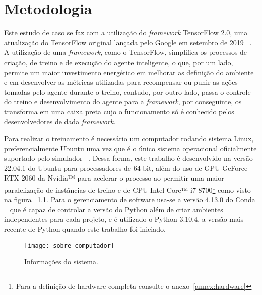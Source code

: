 

\chapter{Metodologia}
\label{cap:dqn}

Este estudo de caso se faz com a utilização do \emph{framework} TensorFlow 2.0, uma atualização do TensorFlow original lançada pelo Google em setembro de 2019 ~\citep{TensorFlow2-release}. A utilização de uma \emph{framework}, como o TensorFlow, simplifica os processos de criação, de treino e de execução do agente inteligente, o que, por um lado, permite um maior investimento energético em melhorar as definição do ambiente e em desenvolver as métricas utilizadas para recompensar ou punir as ações tomadas pelo agente durante o treino, contudo, por outro lado, passa o controle do treino e desenvolvimento do agente para a \emph{framework}, por conseguinte, os transforma em uma caixa preta cujo o funcionamento só é conhecido pelos desenvolvedores de dada \emph{framework}.

Para realizar o treinamento é necessário um computador rodando sistema Linux, preferencialmente Ubuntu uma vez que é o único sistema operacional oficialmente suportado pelo simulador ~\citep{Duckietown-requerimentos}. Dessa forma, este trabalho é desenvolvido na versão 22.04.1 do Ubuntu para processadores de 64-bit, além do uso de GPU GeForce RTX 2060 da Nvidia™ para acelerar o processo ao permitir uma maior paralelização de instâncias de treino e de CPU Intel Core™ i7-8700\footnote{Para a definição de hardware completa consulte o anexo~\ref{annex:hardware}} como visto na figura ~\ref{fig:sobre_computador}. Para o gerenciamento de software usa-se a versão 4.13.0 do Conda ~\citep{Anaconda} que é capaz de controlar a versão do Python além de criar ambientes independentes para cada projeto, e é utilizado o Python 3.10.4, a versão mais recente de Python quando este trabalho foi iniciado.

\begin{figure}
	\centering
	\texttt{[image: sobre\_computador]}
	\caption{Informações do sistema. \label{fig:sobre_computador}}
\end{figure}

